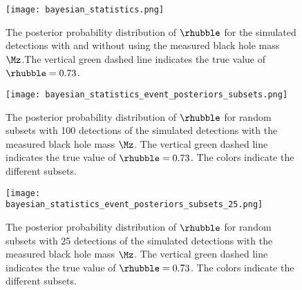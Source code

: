 \begin{figure}
    \centering
    \texttt{[image: bayesian\_statistics.png]}
    \caption[Posterior probability distribution of $\rhubble$]{The posterior probability distribution of $\rhubble$ for the simulated detections with and without using the measured black hole mass $\Mz$.The vertical green dashed line indicates the true value of $\rhubble = 0.73$.}
    \label{fig:posterior-rhubble}
\end{figure}

\begin{figure}
    \centering
    \texttt{[image: bayesian\_statistics\_event\_posteriors\_subsets.png]}
    \caption[Posterior probability distribution of $\rhubble$ of subsets (100 detections)]{The posterior probability distribution of $\rhubble$ for random subsets with 100 detections of the simulated detections with the measured black hole mass $\Mz$. The vertical green dashed line indicates the true value of $\rhubble = 0.73$. The colors indicate the different subsets.}
    \label{fig:posterior-rhubble-subsets}
\end{figure}

\begin{figure}
    \centering
    \texttt{[image: bayesian\_statistics\_event\_posteriors\_subsets\_25.png]}
    \caption[Posterior probability distribution of $\rhubble$ of subsets (25 detections)]{The posterior probability distribution of $\rhubble$ for random subsets with 25 detections of the simulated detections with the measured black hole mass $\Mz$. The vertical green dashed line indicates the true value of $\rhubble = 0.73$. The colors indicate the different subsets.}
    \label{fig:posterior-rhubble-subsets-25}
\end{figure}
